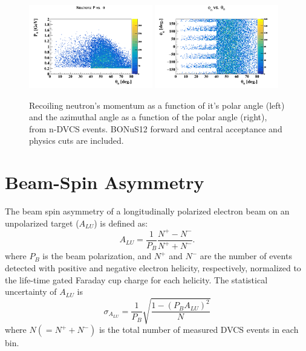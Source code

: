 \begin{figure}[htb]
\centering
  \includegraphics[width=0.48\textwidth,clip,trim=0mm 0mm 0mm 
   20mm]{figs/n_p_theta.png}
\includegraphics[width=0.48\textwidth,clip,trim=0mm 0mm 0mm 
   20mm]{figs/n_phi_theta.png}
  \caption{Recoiling neutron's momentum as a function of it's polar angle 
  (left) and the azimuthal angle as a function of the polar angle (right), from 
   n-DVCS events. BONuS12 forward and central acceptance and physics cuts are 
   included.}
  \label{fig:neutron_kin}
\end{figure}


\section{Beam-Spin Asymmetry}

The beam spin asymmetry of a longitudinally polarized electron beam on an 
unpolarized target ($A_{LU}$) is defined as:
%
\begin{equation}
  A_{LU} = \frac{1}{P_{B}} \frac{N^{+} - N^{-}}{N^{+} + N^{-} }.
\end{equation}
%
where $P_{B}$ is the beam polarization, and $N^{+}$ and $N^{-}$ are the number 
of events detected with positive and negative electron helicity, respectively, 
normalized to the life-time gated Faraday cup charge for each helicity. The 
statistical uncertainty of $A_{LU}$ is
%
\begin{equation}
  \sigma_{A_{LU}} = \frac{1}{P_{B}} \sqrt{ \frac{1 - (P_{B}A_{LU})^{2}}{N}}
\end{equation}
%
where $N (= N^{+} + N^{-}) $ is the total number of measured DVCS events in 
each bin.


